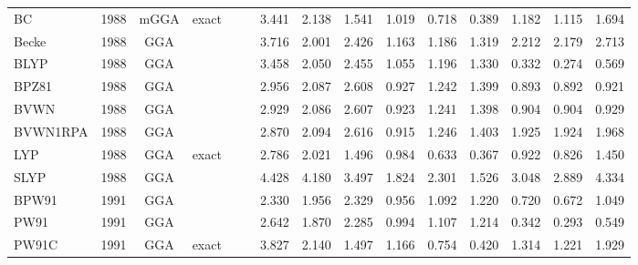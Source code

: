 \begin{landscape}
\begin{longtable}{lcccccrrrrrrrrr}
    BC               & 1988 & mGGA & exact    &             &           & 3.441             & 2.138             & 1.541  & 1.019              & 0.718             & 0.389  & 1.182   & 1.115 & 1.694 \\
    Becke            & 1988 & GGA  &          &             &           & 3.716             & 2.001             & 2.426  & 1.163              & 1.186             & 1.319  & 2.212   & 2.179 & 2.713 \\
    BLYP             & 1988 & GGA  &          &             &           & 3.458             & 2.050             & 2.455  & 1.055              & 1.196             & 1.330  & 0.332   & 0.274 & 0.569 \\
    BPZ81            & 1988 & GGA  &          &             &           & 2.956             & 2.087             & 2.608  & 0.927              & 1.242             & 1.399  & 0.893   & 0.892 & 0.921 \\
    BVWN             & 1988 & GGA  &          &             &           & 2.929             & 2.086             & 2.607  & 0.923              & 1.241             & 1.398  & 0.904   & 0.904 & 0.929 \\
    BVWN1RPA         & 1988 & GGA  &          &             &           & 2.870             & 2.094             & 2.616  & 0.915              & 1.246             & 1.403  & 1.925   & 1.924 & 1.968 \\
    LYP              & 1988 & GGA  & exact    &             &           & 2.786             & 2.021             & 1.496  & 0.984              & 0.633             & 0.367  & 0.922   & 0.826 & 1.450 \\
    SLYP             & 1988 & GGA  &          &             &           & 4.428             & 4.180             & 3.497  & 1.824              & 2.301             & 1.526  & 3.048   & 2.889 & 4.334 \\
    BPW91            & 1991 & GGA  &          &             &           & 2.330             & 1.956             & 2.329  & 0.956              & 1.092             & 1.220  & 0.720   & 0.672 & 1.049 \\
    PW91             & 1991 & GGA  &          &             &           & 2.642             & 1.870             & 2.285  & 0.994              & 1.107             & 1.214  & 0.342   & 0.293 & 0.549 \\
    PW91C            & 1991 & GGA  & exact    &             &           & 3.827             & 2.140             & 1.497  & 1.166              & 0.754             & 0.420  & 1.314   & 1.221 & 1.929 \\

\end{longtable}
\end{landscape}
